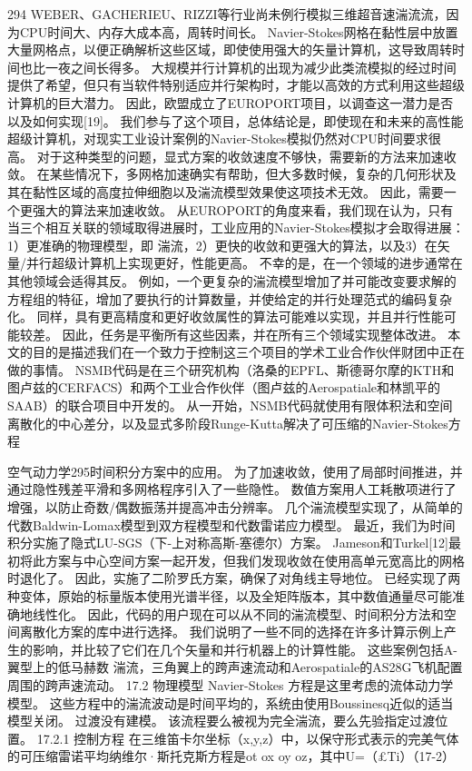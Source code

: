 \documentclass[UTF8,11pt,a4paper,openany,fontset=fandol]{ctexbook}
\begin{document}
294 WEBER、GACHERIEU、RIZZI等行业尚未例行模拟三维超音速湍流流，因为CPU时间大、内存大成本高，周转时间长。 Navier-Stokes网格在黏性层中放置大量网格点，以便正确解析这些区域，即使使用强大的矢量计算机，这导致周转时间也比一夜之间长得多。 大规模并行计算机的出现为减少此类流模拟的经过时间提供了希望，但只有当软件特别适应并行架构时，才能以高效的方式利用这些超级计算机的巨大潜力。 因此，欧盟成立了EUROPORT项目，以调查这一潜力是否以及如何实现[19]。 我们参与了这个项目，总体结论是，即使现在和未来的高性能超级计算机，对现实工业设计案例的Navier-Stokes模拟仍然对CPU时间要求很高。 对于这种类型的问题，显式方案的收敛速度不够快，需要新的方法来加速收敛。 在某些情况下，多网格加速确实有帮助，但大多数时候，复杂的几何形状及其在黏性区域的高度拉伸细胞以及湍流模型效果使这项技术无效。 因此，需要一个更强大的算法来加速收敛。 从EUROPORT的角度来看，我们现在认为，只有当三个相互关联的领域取得进展时，工业应用的Navier-Stokes模拟才会取得进展：1）更准确的物理模型，即 湍流，2）更快的收敛和更强大的算法，以及3）在矢量/并行超级计算机上实现更好，性能更高。 不幸的是，在一个领域的进步通常在其他领域会适得其反。 例如，一个更复杂的湍流模型增加了并可能改变要求解的方程组的特征，增加了要执行的计算数量，并使给定的并行处理范式的编码复杂化。 同样，具有更高精度和更好收敛属性的算法可能难以实现，并且并行性能可能较差。 因此，任务是平衡所有这些因素，并在所有三个领域实现整体改进。 本文的目的是描述我们在一个致力于控制这三个项目的学术工业合作伙伴财团中正在做的事情。 NSMB代码是在三个研究机构（洛桑的EPFL、斯德哥尔摩的KTH和图卢兹的CERFACS）和两个工业合作伙伴（图卢兹的Aerospatiale和林凯平的SAAB）的联合项目中开发的。 从一开始，NSMB代码就使用有限体积法和空间离散化的中心差分，以及显式多阶段Runge-Kutta解决了可压缩的Navier-Stokes方程

空气动力学295时间积分方案中的应用。 为了加速收敛，使用了局部时间推进，并通过隐性残差平滑和多网格程序引入了一些隐性。 数值方案用人工耗散项进行了增强，以防止奇数/偶数振荡并提高冲击分辨率。 几个湍流模型实现了，从简单的代数Baldwin-Lomax模型到双方程模型和代数雷诺应力模型。 最近，我们为时间积分实施了隐式LU-SGS（下-上对称高斯-塞德尔）方案。 Jameson和Turkel[12]最初将此方案与中心空间方案一起开发，但我们发现收敛在使用高单元宽高比的网格时退化了。 因此，实施了二阶罗氏方案，确保了对角线主导地位。 已经实现了两种变体，原始的标量版本使用光谱半径，以及全矩阵版本，其中数值通量尽可能准确地线性化。 因此，代码的用户现在可以从不同的湍流模型、时间积分方法和空间离散化方案的库中进行选择。 我们说明了一些不同的选择在许多计算示例上产生的影响，并比较了它们在几个矢量和并行机器上的计算性能。 这些案例包括A-翼型上的低马赫数 湍流，三角翼上的跨声速流动和Aerospatiale的AS28G飞机配置周围的跨声速流动。 17.2 物理模型 Navier-Stokes 方程是这里考虑的流体动力学模型。 这些方程中的湍流波动是时间平均的，系统由使用Boussinesq近似的适当模型关闭。 过渡没有建模。 该流程要么被视为完全湍流，要么先验指定过渡位置。 17.2.1 控制方程 在三维笛卡尔坐标（x,y,z）中，以保守形式表示的完美气体的可压缩雷诺平均纳维尔·斯托克斯方程是ot ox oy oz，其中U=（£Ti）（17-2）
\end{document}
